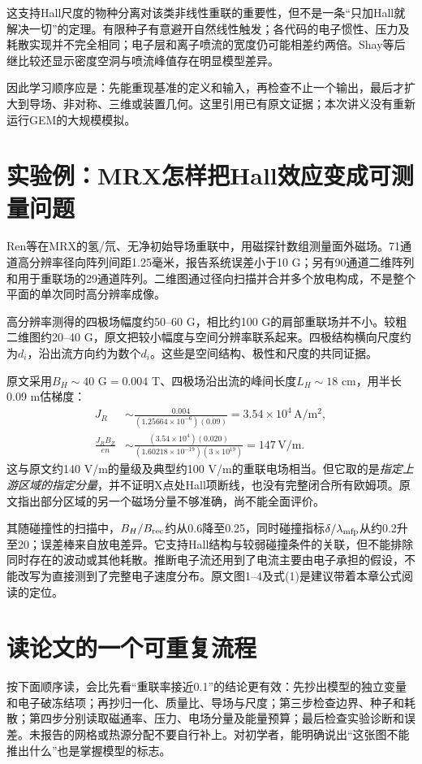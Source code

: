 这支持Hall尺度的物种分离对该类非线性重联的重要性，但不是一条“只加Hall就解决一切”的定理。有限种子有意避开自然线性触发；各代码的电子惯性、压力及耗散实现并不完全相同；电子层和离子喷流的宽度仍可能相差约两倍。Shay等后继比较还显示密度空洞与喷流峰值存在明显模型差异。\citep{Shay2001}

因此学习顺序应是：先能重现基准的定义和输入，再检查不止一个输出，最后才扩大到导场、非对称、三维或装置几何。这里引用已有原文证据；本次讲义没有重新运行GEM的大规模模拟。

\section{实验例：MRX怎样把Hall效应变成可测量问题}
Ren等在MRX的氢/氘、无净初始导场重联中，用磁探针数组测量面外磁场。71通道高分辨率径向阵列间距1.25毫米，报告系统误差小于10 G；另有90通道二维阵列和用于重联场的29通道阵列。二维图通过径向扫描并合并多个放电构成，不是整个平面的单次同时高分辨率成像。\citep{Ren2005}

高分辨率测得的四极场幅度约50--60 G，相比约100 G的肩部重联场并不小。较粗二维图约20--40 G，原文把较小幅度与空间分辨率联系起来。四极结构横向尺度约为$d_i$，沿出流方向约为数个$d_i$。这些是空间结构、极性和尺度的共同证据。

原文采用$B_H\sim40$ G$=0.004$ T、四极场沿出流的峰间长度$L_H\sim18$ cm，用半长0.09 m估梯度：
\begin{align}
J_R&\sim\frac{0.004}{(1.25664\times10^{-6})(0.09)}
=3.54\times10^4\,\mathrm{A/m^2},\\
\frac{J_RB_Z}{en}&\sim
\frac{(3.54\times10^4)(0.020)}{(1.60218\times10^{-19})(3\times10^{19})}
=147\,\mathrm{V/m}.
\end{align}
这与原文约140 V/m的量级及典型约100 V/m的重联电场相当。但它取的是\emph{指定上游区域的指定分量}，并不证明X点处Hall项断线，也没有完整闭合所有欧姆项。原文指出部分区域的另一个磁场分量不够准确，尚不能全面评价。

其随碰撞性的扫描中，$B_H/B_{\rm rec}$约从0.6降至0.25，同时碰撞指标$\delta/\lambda_{\rm mfp}$从约0.2升至20；误差棒来自放电差异。它支持Hall结构与较弱碰撞条件的关联，但不能排除同时存在的波动或其他耗散。推断电子流还用到了电流主要由电子承担的假设，不能改写为直接测到了完整电子速度分布。原文图1--4及式(1)是建议带着本章公式阅读的定位。

\section{读论文的一个可重复流程}
按下面顺序读，会比先看“重联率接近0.1”的结论更有效：先抄出模型的独立变量和电子破冻结项；再抄归一化、质量比、导场与尺度；第三步检查边界、种子和耗散；第四步分别读取磁通率、压力、电场分量及能量预算；最后检查实验诊断和误差。未报告的网格或热源分配不要自行补上。对初学者，能明确说出“这张图不能推出什么”也是掌握模型的标志。
